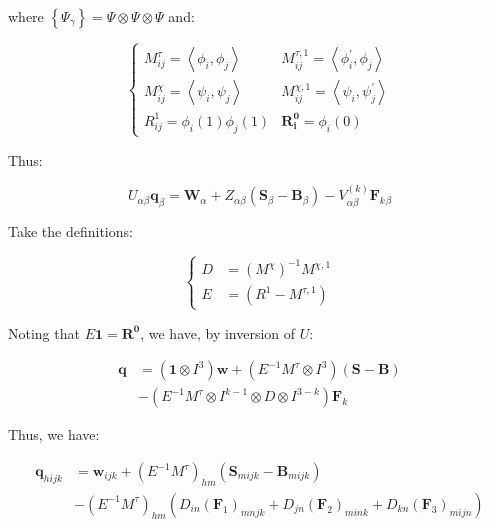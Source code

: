 \documentclass[twoside,english,final,5p,times,twocolumn]{elsarticle}
\begin{document}
where $\left\{ \Psi_{\gamma}\right\} =\Psi\otimes\Psi\otimes\Psi$
and:

\begin{equation}
\begin{cases}
M_{ij}^{\tau}=\left\langle \phi_{i},\phi_{j}\right\rangle  & M_{ij}^{\tau,1}=\left\langle \phi_{i}^{'},\phi_{j}\right\rangle \\
M_{ij}^{\chi}=\left\langle \psi_{i},\psi_{j}\right\rangle  & M_{ij}^{\chi,1}=\left\langle \psi_{i},\psi_{j}^{'}\right\rangle \\
R_{ij}^{1}=\phi_{i}\left(1\right)\phi_{j}\left(1\right) & \boldsymbol{R_{i}^{0}}=\phi_{i}\left(0\right)
\end{cases}\label{eq:inner product matrices}
\end{equation}

Thus:

\begin{equation}
U_{\alpha\beta}\boldsymbol{q}_{\beta}=\boldsymbol{W}_{\alpha}+Z_{\alpha\beta}\left(\boldsymbol{S}_{\beta}-\boldsymbol{B}_{\beta}\right)-V_{\alpha\beta}^{\left(k\right)}\boldsymbol{F}_{k}{}_{\beta}
\end{equation}

Take the definitions:

\begin{equation}
\begin{cases}
D & =\left(M^{\chi}\right)^{-1}M^{\chi,1}\\
E & =\left(R^{1}-M^{\tau,1}\right)
\end{cases}\label{eq:compound matrices}
\end{equation}

Noting that $E\boldsymbol{1}=\boldsymbol{R^{0}}$, we have, by inversion
of $U$:

\begin{align}
\boldsymbol{q} & =\left(\boldsymbol{1}\otimes I^{3}\right)\boldsymbol{w}+\left(E^{-1}M^{\tau}\otimes I^{3}\right)\left(\boldsymbol{S}-\boldsymbol{B}\right)\\
 & -\left(E^{-1}M^{\tau}\otimes I^{k-1}\otimes D\otimes I^{3-k}\right)\boldsymbol{F}_{k}\nonumber 
\end{align}

Thus, we have:

\begin{align}
\boldsymbol{q}_{hijk} & =\boldsymbol{w}_{ijk}+\left(E^{-1}M^{\tau}\right)_{hm}\left(\boldsymbol{S}_{mijk}-\boldsymbol{B}_{mijk}\right)\label{eq:q system}\\
 & -\left(E^{-1}M^{\tau}\right)_{hm}\left(D_{in}\left(\boldsymbol{F}_{1}\right)_{mnjk}+D_{jn}\left(\boldsymbol{F}_{2}\right)_{mink}+D_{kn}\left(\boldsymbol{F}_{3}\right)_{mijn}\right)\nonumber 
\end{align}
\end{document}
